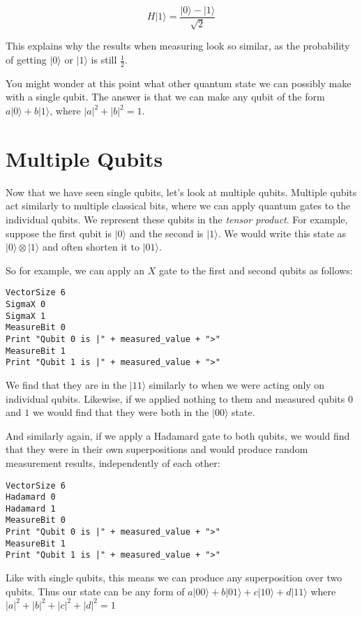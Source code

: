 \documentclass[twocolumn]{article}
\begin{document}
$$H|1\rangle = \frac{|0\rangle - |1\rangle}{\sqrt{2}}$$

This explains why the results when measuring look so similar, as the probability of getting $|0\rangle$ or $|1\rangle$ is still $\frac{1}{2}$.

You might wonder at this point what other quantum state we can possibly make with a single qubit. The answer is that we can make any qubit of the form $a|0\rangle + b|1\rangle$, where $|a|^2 + |b|^2 = 1$.

\section{Multiple Qubits}

Now that we have seen single qubits, let's look at multiple qubits. Multiple qubits act similarly to multiple classical bits, where we can apply quantum gates to the individual qubits. We represent these qubits in the {\em tensor product}. For example, suppose the first qubit is $|0\rangle$ and the second is $|1\rangle$. We would write this state as $|0\rangle \otimes |1\rangle$ and often shorten it to $|01\rangle$.

So for example, we can apply an $X$ gate to the first and second qubits as follows:

\begin{lstlisting}
VectorSize 6
SigmaX 0
SigmaX 1
MeasureBit 0
Print "Qubit 0 is |" + measured_value + ">"
MeasureBit 1
Print "Qubit 1 is |" + measured_value + ">"
\end{lstlisting}

We find that they are in the $|11\rangle$ similarly to when we were acting only on individual qubits. Likewise, if we applied nothing to them and measured qubits $0$ and $1$ we would find that they were both in the $|00\rangle$ state.

And similarly again, if we apply a Hadamard gate to both qubits, we would find that they were in their own superpositions and would produce random measurement results, independently of each other:

\begin{lstlisting}
VectorSize 6
Hadamard 0
Hadamard 1
MeasureBit 0
Print "Qubit 0 is |" + measured_value + ">"
MeasureBit 1
Print "Qubit 1 is |" + measured_value + ">"
\end{lstlisting}

Like with single qubits, this means we can produce any superposition over two qubits. Thus our state can be any form of $a|00\rangle + b|01\rangle + c|10\rangle + d|11\rangle$ where $|a|^2 + |b|^2 + |c|^2 + |d|^2 = 1$
\end{document}
